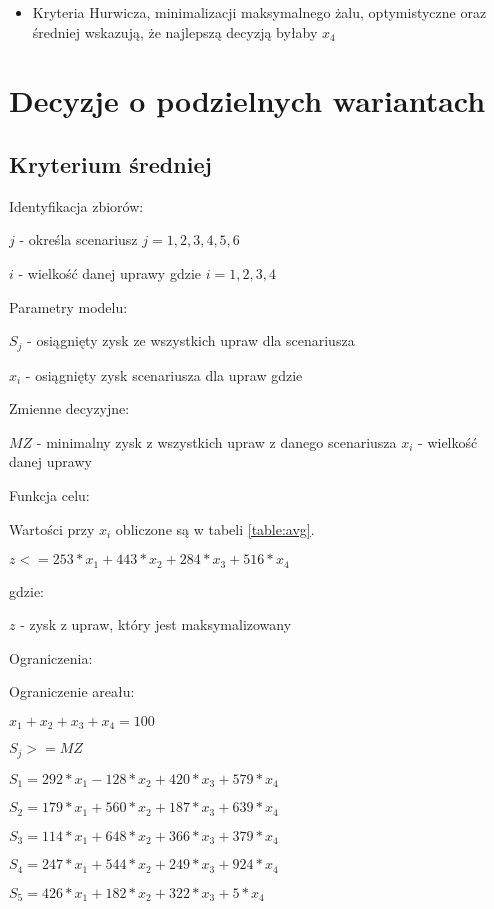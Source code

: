 \documentclass{article}
\begin{document}
\begin{itemize}
  \item Kryteria Hurwicza, minimalizacji maksymalnego żalu, optymistyczne oraz średniej wskazują, że najlepszą decyzją byłaby $x_4$
\end{itemize}

\newpage
\section{Decyzje o podzielnych wariantach}

\subsection{Kryterium średniej}

\noindent
Identyfikacja zbiorów:

$j$ - określa scenariusz $j = {1,2,3,4,5,6}$

$i$ - wielkość danej uprawy gdzie $i = {1,2,3,4}$

\noindent
Parametry modelu:

$S_j$ - osiągnięty zysk ze wszystkich upraw dla scenariusza

$x_i$ - osiągnięty zysk scenariusza dla upraw gdzie

\noindent
Zmienne decyzyjne:

$MZ$ - minimalny zysk z wszystkich upraw z danego scenariusza
$x_i$ - wielkość danej uprawy

\noindent
Funkcja celu:

Wartości przy $x_i$ obliczone są w tabeli \ref{table:avg}.

$z <= 253 * x_1 + 443 * x_2 + 284 * x_3 + 516 * x_4$ 

gdzie:

$z$ - zysk z upraw, który jest maksymalizowany

\noindent
Ograniczenia:

Ograniczenie areału:

$x_1 + x_2 + x_3 + x_4 = 100$

$S_j >= MZ$

$S_1 = 292 * x_1 - 128 * x_2 + 420 * x_3 + 579 * x_4$

$S_2 = 179 * x_1 + 560 * x_2 + 187 * x_3 + 639 * x_4$

$S_3 = 114 * x_1 + 648 * x_2 + 366 * x_3 + 379 * x_4$

$S_4 = 247 * x_1 + 544 * x_2 + 249 * x_3 + 924 * x_4$

$S_5 = 426 * x_1 + 182 * x_2 + 322 * x_3 + 5 * x_4$
\end{document}
